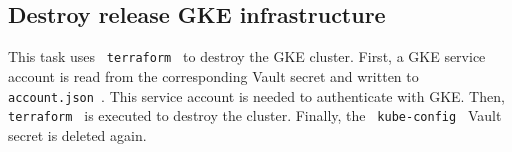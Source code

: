 \subsection{Destroy release GKE infrastructure}\label{subsec:destroy-release-gke-infrastructure}

This task uses \verb| terraform | to destroy the GKE cluster.
First, a GKE service account is read from the corresponding Vault secret and written to \verb| account.json |.
This service account is needed to authenticate with GKE.
Then, \verb| terraform | is executed to destroy the cluster.
Finally, the \verb| kube-config | Vault secret is deleted again.
